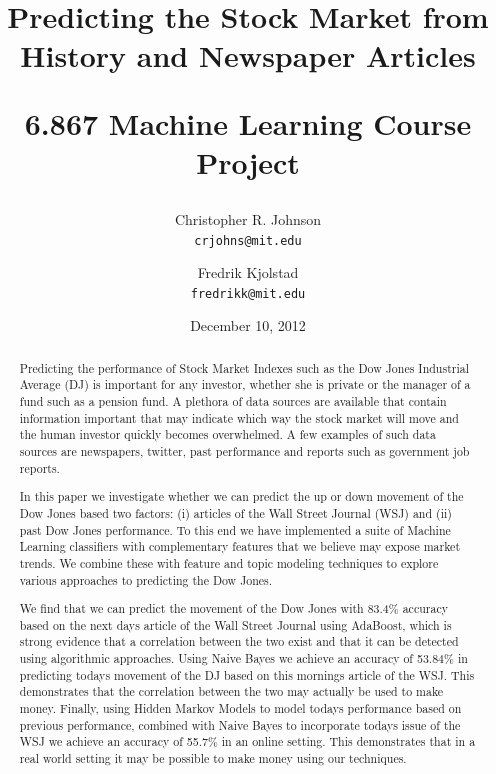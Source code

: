 \documentclass[10pt, twocolumn]{article}
\begin{document}
\title{Predicting the Stock Market from History and Newspaper Articles \\ \begin{large}6.867 Machine Learning Course Project\end{large}}

\author{Christopher R. Johnson  \\ \texttt{crjohns@mit.edu} \and Fredrik Kjolstad \\ \texttt{fredrikk@mit.edu}}
\date{December 10, 2012}
\maketitle

\begin{abstract}
Predicting the performance of Stock Market Indexes such as the Dow Jones Industrial Average (DJ) is important for any investor, whether she is private or the manager of a fund such as a pension fund.
A plethora of data sources are available that contain information important that may indicate which way the stock market will move and the human investor quickly becomes overwhelmed. A few examples of such data sources are newspapers, twitter, past performance and reports such as government job reports.

In this paper we investigate whether we can predict the up or down movement of the Dow Jones based two factors: (i) articles of the Wall Street Journal (WSJ) and (ii) past Dow Jones performance.
To this end we have implemented a suite of Machine Learning classifiers with complementary features that we believe may expose market trends.
We combine these with feature and topic modeling techniques to explore various approaches to predicting the Dow Jones.

We find that we can predict the movement of the Dow Jones with 83.4\% accuracy based on the next days article of the Wall Street Journal using AdaBoost, which is strong evidence that a correlation between the two exist and that it can be detected using algorithmic approaches.
Using Naive Bayes we achieve an accuracy of 53.84\% in predicting todays movement of the DJ based on this mornings article of the WSJ.
This demonstrates that the correlation between the two may actually be used to make money.
Finally, using Hidden Markov Models to model todays performance based on previous performance, combined with Naive Bayes to incorporate todays issue of the WSJ we achieve an accuracy of 55.7\% in an online setting.
This demonstrates that in a real world setting it may be possible to make money using our techniques.
\end{abstract}
\end{document}
